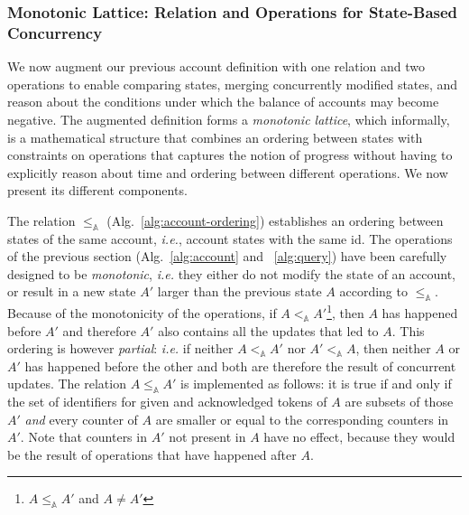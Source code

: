 \documentclass[9pt, oneside]{article}   	%
\begin{document}
\subsubsection{Monotonic Lattice: Relation and Operations for State-Based Concurrency}
\label{sec:account:ordering-merging}

We now augment our previous account definition with one relation and two operations to enable comparing states, merging concurrently modified states, and reason about the conditions under which the balance of accounts may become negative. The augmented definition forms a \textit{monotonic lattice}, which informally, is a mathematical structure that combines an ordering between states with constraints on operations that captures the notion of progress without having to explicitly reason about time and ordering between different operations. We now present its different components.

The relation $\leq_\mathds{A}$ (Alg.~\ref{alg:account-ordering}) establishes an ordering between states of the same account, \textit{i.e.}, account states with the same id. The operations of the previous section (Alg.~\ref{alg:account} and ~\ref{alg:query}) have been carefully designed to be \textit{monotonic}, \textit{i.e.} they either do not modify the state of an account, or result in a new state $A'$ larger than the previous state $A$ according to $\leq_\mathds{A}$. Because of the monotonicity of the operations, if $A <_\mathds{A} A'$\footnote{$A \leq_\mathds{A} A'$ and $A \neq A'$}, then $A$ has happened before $A'$ and therefore $A'$ also contains all the updates that led to $A$. This ordering is however \textit{partial}: \textit{i.e.} if neither $A <_\mathds{A} A'$ nor $A' <_\mathds{A} A$, then neither $A$ or $A'$ has happened before the other and both are therefore the result of concurrent updates. The relation $A \leq_\mathds{A} A'$ is implemented as follows: it is true if and only if the set of identifiers for given and acknowledged tokens of $A$ are subsets of those $A'$ \textit{and} every counter of $A$ are smaller or equal to the corresponding counters in $A'$. Note that counters in $A'$ not present in $A$ have no effect, because they would be the result of operations that have happened after $A$. 
\end{document}
